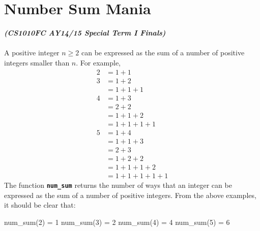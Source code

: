 \section{Number Sum Mania}
\textbf{\textit{(CS1010FC AY14/15 Special Term I Finals)}} \\ \\
A positive integer $n \ge 2$ can be expressed as the sum of a number of positive integers smaller
than $n$. For example,
\begin{align*}
2 &= 1+1 \\
3 &= 1+2 \\
&= 1+1+1 \\
4 &= 1+3 \\
&= 2+2 \\
&= 1+1+2 \\
&= 1+1+1+1 \\
5 &= 1+4 \\
&= 1+1+3 \\
&= 2+3 \\
&= 1+2+2 \\
&= 1+1+1+2 \\
&= 1+1+1+1+1
\end{align*}
The function \texttt{\bfseries num\_sum} returns the number of ways that an integer can be expressed as the sum
of a number of positive integers. From the above examples, it should be clear that:
\begin{python}
num_sum(2) = 1
num_sum(3) = 2
num_sum(4) = 4
num_sum(5) = 6
\end{python}

